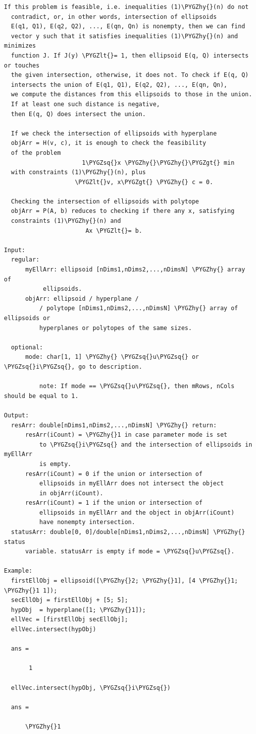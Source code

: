 \documentclass[letterpaper,10pt,english]{sphinxmanual}
\def\PYGZlt{\char`\<}
\def\PYGZgt{\char`\>}
\def\PYGZhy{\char`\-}
\def\PYGZsq{\char`\'}
\begin{document}
\begin{Verbatim}[commandchars=\\\{\}]
  If this problem is feasible, i.e. inequalities (1)\PYGZhy{}(n) do not
  contradict, or, in other words, intersection of ellipsoids
  E(q1, Q1), E(q2, Q2), ..., E(qn, Qn) is nonempty, then we can find
  vector y such that it satisfies inequalities (1)\PYGZhy{}(n) and minimizes
  function J. If J(y) \PYGZlt{}= 1, then ellipsoid E(q, Q) intersects or touches
  the given intersection, otherwise, it does not. To check if E(q, Q)
  intersects the union of E(q1, Q1), E(q2, Q2), ..., E(qn, Qn),
  we compute the distances from this ellipsoids to those in the union.
  If at least one such distance is negative,
  then E(q, Q) does intersect the union.

  If we check the intersection of ellipsoids with hyperplane
  objArr = H(v, c), it is enough to check the feasibility
  of the problem
                      1\PYGZsq{}x \PYGZhy{}\PYGZhy{}\PYGZgt{} min
  with constraints (1)\PYGZhy{}(n), plus
                    \PYGZlt{}v, x\PYGZgt{} \PYGZhy{} c = 0.

  Checking the intersection of ellipsoids with polytope
  objArr = P(A, b) reduces to checking if there any x, satisfying
  constraints (1)\PYGZhy{}(n) and
                       Ax \PYGZlt{}= b.

Input:
  regular:
      myEllArr: ellipsoid [nDims1,nDims2,...,nDimsN] \PYGZhy{} array of
           ellipsoids.
      objArr: ellipsoid / hyperplane /
          / polytope [nDims1,nDims2,...,nDimsN] \PYGZhy{} array of ellipsoids or
          hyperplanes or polytopes of the same sizes.

  optional:
      mode: char[1, 1] \PYGZhy{} \PYGZsq{}u\PYGZsq{} or \PYGZsq{}i\PYGZsq{}, go to description.

          note: If mode == \PYGZsq{}u\PYGZsq{}, then mRows, nCols should be equal to 1.

Output:
  resArr: double[nDims1,nDims2,...,nDimsN] \PYGZhy{} return:
      resArr(iCount) = \PYGZhy{}1 in case parameter mode is set
          to \PYGZsq{}i\PYGZsq{} and the intersection of ellipsoids in myEllArr
          is empty.
      resArr(iCount) = 0 if the union or intersection of
          ellipsoids in myEllArr does not intersect the object
          in objArr(iCount).
      resArr(iCount) = 1 if the union or intersection of
          ellipsoids in myEllArr and the object in objArr(iCount)
          have nonempty intersection.
  statusArr: double[0, 0]/double[nDims1,nDims2,...,nDimsN] \PYGZhy{} status
      variable. statusArr is empty if mode = \PYGZsq{}u\PYGZsq{}.

Example:
  firstEllObj = ellipsoid([\PYGZhy{}2; \PYGZhy{}1], [4 \PYGZhy{}1; \PYGZhy{}1 1]);
  secEllObj = firstEllObj + [5; 5];
  hypObj  = hyperplane([1; \PYGZhy{}1]);
  ellVec = [firstEllObj secEllObj];
  ellVec.intersect(hypObj)

  ans =

       1

  ellVec.intersect(hypObj, \PYGZsq{}i\PYGZsq{})

  ans =

      \PYGZhy{}1
\end{Verbatim}
\end{document}
